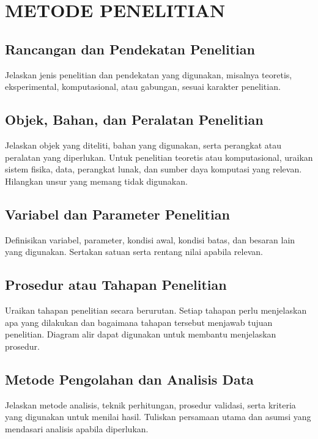 \documentclass[skripsi]{ugmskripsi}
\begin{document}
\chapter{METODE PENELITIAN}

\section{Rancangan dan Pendekatan Penelitian}
Jelaskan jenis penelitian dan pendekatan yang digunakan, misalnya teoretis,
eksperimental, komputasional, atau gabungan, sesuai karakter penelitian.

\section{Objek, Bahan, dan Peralatan Penelitian}
Jelaskan objek yang diteliti, bahan yang digunakan, serta perangkat atau
peralatan yang diperlukan. Untuk penelitian teoretis atau komputasional,
uraikan sistem fisika, data, perangkat lunak, dan sumber daya komputasi yang
relevan. Hilangkan unsur yang memang tidak digunakan.

\section{Variabel dan Parameter Penelitian}
Definisikan variabel, parameter, kondisi awal, kondisi batas, dan besaran
lain yang digunakan. Sertakan satuan serta rentang nilai apabila relevan.

\section{Prosedur atau Tahapan Penelitian}
Uraikan tahapan penelitian secara berurutan. Setiap tahapan perlu menjelaskan
apa yang dilakukan dan bagaimana tahapan tersebut menjawab tujuan penelitian.
Diagram alir dapat digunakan untuk membantu menjelaskan prosedur.

\section{Metode Pengolahan dan Analisis Data}
Jelaskan metode analisis, teknik perhitungan, prosedur validasi, serta kriteria
yang digunakan untuk menilai hasil. Tuliskan persamaan utama dan asumsi yang
mendasari analisis apabila diperlukan.
\end{document}
